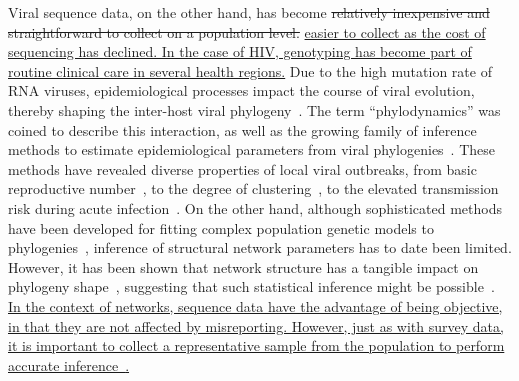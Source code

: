 \documentclass[12pt]{article}\usepackage[]{graphicx}\usepackage[]{color}
\newcommand{\add}[1]{\color{blue} \uline{#1} \color{black}}
\newcommand{\del}[1]{\color{red} \sout{#1} \color{black}}
\begin{document}
Viral sequence data, on the other hand, has become \del{relatively inexpensive
and straightforward to collect on a population level.} \add{easier to collect
as the cost of sequencing has declined. In the case of HIV, genotyping has
become part of routine clinical care in several health regions.} Due to the
high mutation rate of RNA viruses, epidemiological processes impact the course
of viral evolution, thereby shaping the inter-host viral
phylogeny~\autocite{drummond2003measurably}. The term ``phylodynamics'' was
coined to describe this interaction, as well as the growing family of inference
methods to estimate epidemiological parameters from viral
phylogenies~\autocite{grenfell2004unifying}. These methods have revealed
diverse properties of local viral outbreaks, from basic reproductive
number~\autocite{stadler2012estimating}, to the degree of
clustering~\autocite{hughes2009molecular}, to the elevated transmission risk
during acute infection~\autocite{volz2012simple}. On the other hand, although
sophisticated methods have been developed for fitting complex population
genetic models to phylogenies~\autocite{volz2012complex,
rasmussen2014phylodynamic}, inference of structural network parameters has to
date been limited. However, it has been shown that network structure has a
tangible impact on phylogeny shape~\autocite{leventhal2012inferring,
colijn2014phylogenetic, goodreau2006assessing, robinson2013dynamics,
villandre2016assessment}, suggesting that such statistical inference might be
possible~\autocite{welch2011statistical}. \add{In the context of networks,
sequence data have the advantage of being objective, in that they are not
affected by misreporting. However, just as with survey data, it is important to
collect a representative sample from the population to perform accurate
inference~\autocite{novitsky2014impact}.}
\end{document}
